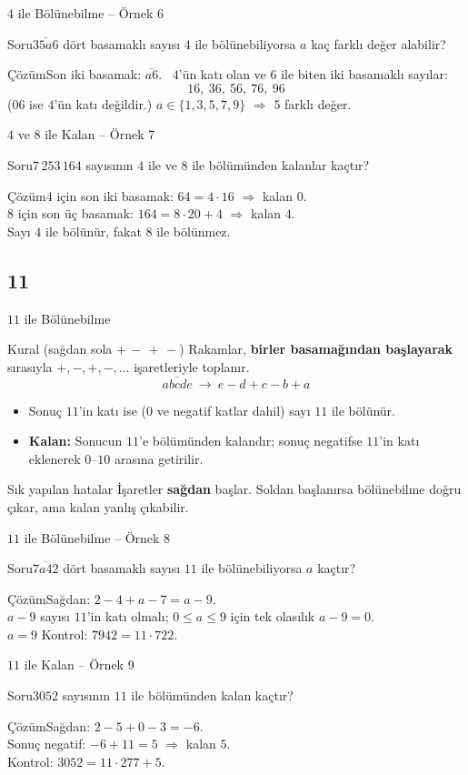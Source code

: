 \documentclass[aspectratio=169,11pt,handout]{beamer}
\newcommand{\soru}[3]{%
\begin{frame}{#1}
  \begin{block}{Soru}\large #2\end{block}
  \pause
  \begin{exampleblock}{Çözüm}\large #3\end{exampleblock}
\end{frame}}
\newcommand{\ab}[1]{\overline{#1}}
\begin{document}
\soru{\(4\) ile Bölünebilme -- Örnek 6}
{\(\ab{35a6}\) dört basamaklı sayısı \(4\) ile bölünebiliyorsa \(a\) kaç farklı değer alabilir?}
{Son iki basamak: \(\ab{a6}\). \ \(4\)'ün katı olan ve \(6\) ile biten iki basamaklı sayılar:
\[16,\ 36,\ 56,\ 76,\ 96\]
(\(06\) ise \(4\)'ün katı değildir.) \(a\in\{1,3,5,7,9\}\) \(\Rightarrow\) \(5\) farklı değer.}

\soru{\(4\) ve \(8\) ile Kalan -- Örnek 7}
{\(7\,253\,164\) sayısının \(4\) ile ve \(8\) ile bölümünden kalanlar kaçtır?}
{\(4\) için son iki basamak: \(64=4\cdot 16\) \(\Rightarrow\) kalan \(0\).\\[3pt]
\(8\) için son üç basamak: \(164=8\cdot 20+4\) \(\Rightarrow\) kalan \(4\).\\[3pt]
Sayı \(4\) ile bölünür, fakat \(8\) ile bölünmez.}

\subsection{11}
\begin{frame}{\(11\) ile Bölünebilme}
\begin{block}{Kural (sağdan sola \(+\,-\,+\,-\))}
Rakamlar, \textbf{birler basamağından başlayarak} sırasıyla \(+,-,+,-,\dots\) işaretleriyle toplanır.
\[\ab{abcde}\ \longrightarrow\ e-d+c-b+a\]
\begin{itemize}
\item Sonuç \(11\)'in katı ise (\(0\) ve negatif katlar dahil) sayı \(11\) ile bölünür.
\item \textbf{Kalan:} Sonucun \(11\)'e bölümünden kalandır; sonuç negatifse \(11\)'in katı eklenerek \(0\)--\(10\) arasına getirilir.
\end{itemize}
\end{block}
\begin{alertblock}{Sık yapılan hatalar}
İşaretler \textbf{sağdan} başlar. Soldan başlanırsa bölünebilme doğru çıkar, ama kalan yanlış çıkabilir.
\end{alertblock}
\end{frame}

\soru{\(11\) ile Bölünebilme -- Örnek 8}
{\(\ab{7a42}\) dört basamaklı sayısı \(11\) ile bölünebiliyorsa \(a\) kaçtır?}
{Sağdan: \(2-4+a-7=a-9\).\\[3pt]
\(a-9\) sayısı \(11\)'in katı olmalı; \(0\le a\le 9\) için tek olasılık \(a-9=0\).\\[3pt]
\(a=9\) \quad Kontrol: \(7942=11\cdot 722\).}

\soru{\(11\) ile Kalan -- Örnek 9}
{\(3052\) sayısının \(11\) ile bölümünden kalan kaçtır?}
{Sağdan: \(2-5+0-3=-6\).\\[3pt]
Sonuç negatif: \(-6+11=5\) \(\Rightarrow\) kalan \(5\).\\[3pt]
Kontrol: \(3052=11\cdot 277+5\).}
\end{document}
